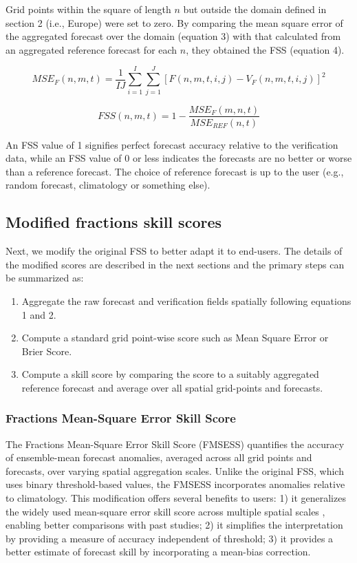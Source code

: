 \documentclass[preprint,12pt,authoryear]{elsarticle}
\begin{document}
Grid points within the square of length $n$ but outside the domain defined in section 2 (i.e., Europe) were set to zero. By comparing the mean square error of the aggregated forecast over the domain (equation 3) with that calculated from an aggregated reference forecast for each $n$, they obtained the FSS (equation 4). 

\begin{equation}
    MSE_{F}(n, m, t) = \frac{1}{IJ} \sum_{i=1}^{I}\sum_{j=1}^{J} [F(n,m,t,i,j) - V_{F}(n,m,t,i,j)]^{2}
\end{equation}

\begin{equation}
    FSS(n,m, t) = 1 - \frac{MSE_{F}(m,n,t)}{MSE_{REF}(n,t)}
\end{equation}

An FSS value of 1 signifies perfect forecast accuracy relative to the verification data, while an FSS value of 0 or less indicates the forecasts are no better or worse than a reference forecast. The choice of reference forecast is up to the user (e.g., random forecast, climatology or something else).

\subsection{Modified fractions skill scores}

Next, we modify the original FSS to better adapt it to end-users. The details of the modified scores are described in the next sections and the primary steps can be summarized as:  

\begin{enumerate}
    \item Aggregate the raw forecast and verification fields spatially following equations 1 and 2.
    \item Compute a standard grid point-wise score such as Mean Square Error or Brier Score.
    \item Compute a skill score by comparing the score to a suitably aggregated reference forecast and average over all spatial grid-points and forecasts.
\end{enumerate}

\subsubsection{Fractions Mean-Square Error Skill Score}

The Fractions Mean-Square Error Skill Score (FMSESS) quantifies the accuracy of ensemble-mean forecast anomalies, averaged across all grid points and forecasts, over varying spatial aggregation scales. Unlike the original FSS, which uses binary threshold-based values, the FMSESS incorporates anomalies relative to climatology. This modification offers several benefits to users: 1) it generalizes the widely used mean-square error skill score across multiple spatial scales \citep{jolliffeStephenson2012}, enabling better comparisons with past studies; 2) it simplifies the interpretation by providing a measure of accuracy independent of threshold; 3) it provides a better estimate of forecast skill by incorporating a mean-bias correction. 
\end{document}

